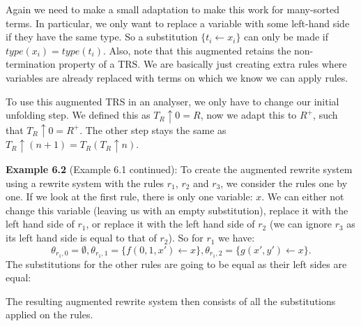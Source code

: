 Again we need to make a small adaptation to make this work for many-sorted terms. In particular, we only want to replace a variable with some left-hand side if they have the same type. So a substitution $\{ t_i \leftarrow x_i \}$ can only be made if $\textit{type}(x_i) = \textit{type}(t_i)$. Also, note that this augmented retains the non-termination property of a TRS. We are basically just creating extra rules where variables are already replaced with terms on which we know we can apply rules.  

To use this augmented TRS in an analyser, we only have to change our initial unfolding step. We defined this as $T_R \uparrow 0 = R$, now we adapt this to $R^+$, such that $T_R \uparrow 0 = R^+$. The other step stays the same as $T_R \uparrow (n + 1) = T_R(T_R \uparrow n)$. 

\textbf{Example 6.2} (Example 6.1 continued): To create the augmented rewrite system using a rewrite system with the rules $r_1$, $r_2$ and $r_3$, we consider the rules one by one. If we look at the first rule, there is only one variable: $x$. We can either not change this variable (leaving us with an empty substitution), replace it with the left hand side of $r_1$, or replace it with the left hand side of $r_2$ (we can ignore $r_3$ as its left hand side is equal to that of $r_2$). So for $r_1$ we have:
$$ \theta_{r_1,0} = \emptyset, \theta_{r_1,1} = \{ f(0, 1, x') \leftarrow x \}, \theta_{r_1,2} = \{ g(x', y') \leftarrow x \}\text{.}$$
The substitutions for the other rules are going to be equal as their left sides are equal:
\begin{center}
\end{center}
The resulting augmented rewrite system then consists of all the substitutions applied on the rules.

